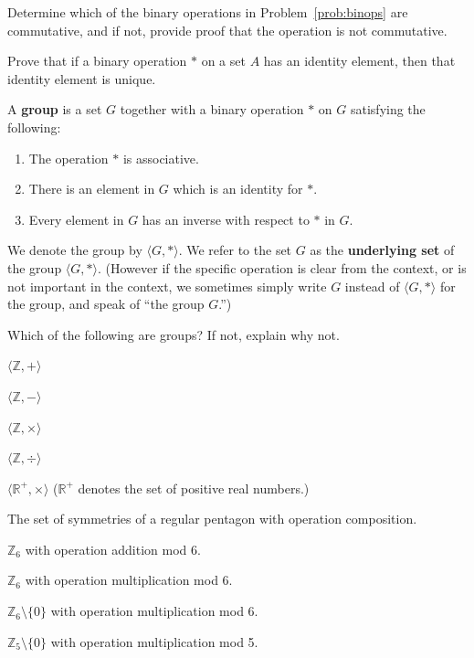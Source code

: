 \begin{problem}
Determine which of the binary operations in Problem~\ref{prob:binops} are commutative, and if not, provide proof that the operation is not commutative.
\end{problem}

\begin{problem}
Prove that if a binary operation \(*\) on a set \(A\) has an identity element, then that identity element is unique.
\end{problem}

\begin{definition}
A \textbf{group} is a set \(G\) together with a binary operation \(*\) on \(G\) satisfying the following:
\begin{enumerate}[itemsep=0pt, topsep=3pt]
  \item The operation \(*\) is associative.
  \item There is an element in \(G\) which is an identity for \(*\).
  \item Every element in \(G\) has an inverse with respect to \(*\) in \(G\).
\end{enumerate}
We denote the group by \(\langle G, * \rangle\). We refer to the set \(G\) as the \textbf{underlying set} of the group \(\langle G, * \rangle\). (However if the specific operation is clear from the context, or is not important in the context, we sometimes simply write \(G\) instead of \(\langle G, * \rangle\) for the group, and speak of ``the group \(G\).'')
\end{definition}

\begin{problem}\label{prob:groupex}
Which of the following are groups? If not, explain why not.
\begin{problemparts}
  \item  \(\langle \mathbb{Z}, + \rangle\)
  \item  \(\langle \mathbb{Z}, - \rangle\)
  \item  \(\langle \mathbb{Z}, \times \rangle\)
  \item  \(\langle \mathbb{Z}, \div \rangle\)
  \item  \(\langle \mathbb{R}^+, \times \rangle\) (\(\mathbb{R}^+\) denotes the set of positive real numbers.)
  \item  The set of symmetries of a regular pentagon with operation composition.
  \item  \(\mathbb{Z}_6\) with operation addition mod 6.
  \item  \(\mathbb{Z}_6\) with operation multiplication mod 6.
  \item  \(\mathbb{Z}_6 \setminus \{0\}\) with operation multiplication mod 6.
  \item  \(\mathbb{Z}_5 \setminus \{0\}\) with operation multiplication mod 5.
\end{problemparts}
\end{problem}


